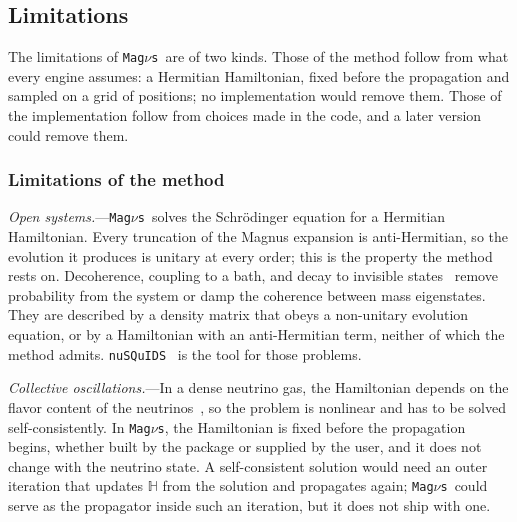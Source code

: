 \documentclass[final,5p,times,twocolumn,sort,compress]{elsarticle}
\makeatletter
\DeclareRobustCommand{\_}{%
  \ifmmode\nfss@text{\textunderscore}\else\textunderscore\allowbreak\fi}
\newcommand{\magnus}{{\tt Mag}\ensuremath{\nu}{\tt s}}
\makeatother
\begin{document}

\subsection{Limitations}
\label{sec:limitations}

The limitations of \magnus\ are of two kinds. Those of the method follow from what every engine assumes: a Hermitian Hamiltonian, fixed before the propagation and sampled on a grid of positions; no implementation would remove them. Those of the implementation follow from choices made in the code, and a later version could remove them.


\subsubsection{Limitations of the method}

\textit{Open systems.}---\magnus\ solves the Schr\"odinger equation for a Hermitian Hamiltonian. Every truncation of the Magnus expansion is anti-Hermitian, so the evolution it produces is unitary at every order; this is the property the method rests on. Decoherence, coupling to a bath, and decay to invisible states\ \cite{Baerwald:2012kc, Valera:2024buc} remove probability from the system or damp the coherence between mass eigenstates. They are described by a density matrix that obeys a non-unitary evolution equation, or by a Hamiltonian with an anti-Hermitian term, neither of which the method admits. {\tt nuSQuIDS}\ \cite{Delgado:2014kpa, NuSQuIDS} is the tool for those problems.

\smallskip

\textit{Collective oscillations.}---In a dense neutrino gas, the Hamiltonian depends on the flavor content of the neutrinos\ \cite{Duan:2010bg, Mirizzi:2015eza}, so the problem is nonlinear and has to be solved self-consistently. In \magnus, the Hamiltonian is fixed before the propagation begins, whether built by the package or supplied by the user, and it does not change with the neutrino state. A self-consistent solution would need an outer iteration that updates $\mathbb{H}$ from the solution and propagates again; \magnus\ could serve as the propagator inside such an iteration, but it does not ship with one.

\smallskip
\end{document}
